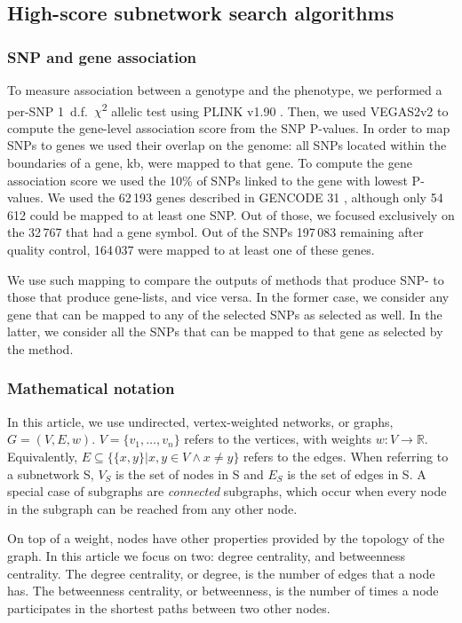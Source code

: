 \documentclass[twocolumn, 11pt, draft]{article}
\begin{document}
\subsection{High-score subnetwork search algorithms}
\subsubsection{SNP and gene association}
\label{methods:node_score}
To measure association between a genotype and the phenotype, we performed a per-SNP 1~d.f.~\(\chi\)\textsuperscript{2} allelic test using PLINK v1.90 \cite{chang_second-generation_2015}. Then, we used VEGAS2v2 to compute the gene-level association score \cite{mishra_vegas2:_2015} from the SNP P-values. In order to map SNPs to genes we used their overlap on the genome: all SNPs located within the boundaries of a gene,  kb, were mapped to that gene. To compute the gene association score we used the 10\% of SNPs linked to the gene with lowest P-values. We used the 62\,193 genes described in GENCODE 31 \cite{frankish_gencode_2019}, although only 54\,612 could be mapped to at least one SNP. Out of those, we focused exclusively on the 32\,767 that had a gene symbol. Out of the SNPs 197\,083 remaining after quality control, 164\,037 were mapped to at least one of these genes. 

We use such mapping to compare the outputs of methods that produce SNP- to those that produce gene-lists, and vice versa. In the former case, we consider any gene that can be mapped to any of the selected SNPs as selected as well. In the latter, we consider all the SNPs that can be mapped to that gene as selected by the method.

\subsubsection{Mathematical notation}
\label{methods:notation}
In this article, we use undirected, vertex-weighted networks, or graphs, $G = (V,E,w)$. $V = \{v_{1}, \dots{}, v_{n}\}$ refers to the vertices, with weights $w: V \rightarrow \mathbb{R}$. Equivalently, $E \subseteq \{\{x,y\} | x,y \in V \wedge x \neq y\}$ refers to the edges. When referring to a subnetwork S, $V_{S}$ is the set of nodes in S and $E_{S}$ is the set of edges in S. A special case of subgraphs are \emph{connected} subgraphs, which occur when every node in the subgraph can be reached from any other node.

On top of a weight, nodes have other properties provided by the topology of the graph. In this article we focus on two: degree centrality, and betweenness centrality. The degree centrality, or degree, is the number of edges that a node has. The betweenness centrality, or betweenness, is the number of times a node participates in the shortest paths between two other nodes.
\end{document}
